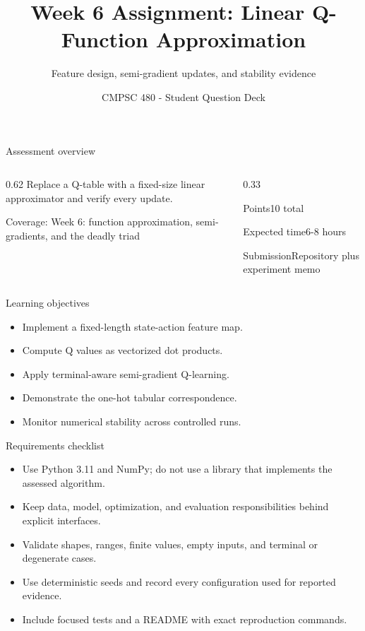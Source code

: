 \documentclass[aspectratio=169,11pt]{beamer}
\title[Week 6 Assignment Questions]{Week 6 Assignment: Linear Q-Function Approximation}
\subtitle{Feature design, semi-gradient updates, and stability evidence}
\author{CMPSC 480 - Student Question Deck}
\date{}
\begin{document}
\begin{frame}
  \titlepage
\end{frame}

\begin{frame}{Assessment overview}
\begin{columns}[T,onlytextwidth]
\begin{column}{0.62\textwidth}
\Large Replace a Q-table with a fixed-size linear approximator and verify every update.

\vspace{0.35cm}
\normalsize
Coverage: Week 6: function approximation, semi-gradients, and the deadly triad
\end{column}
\begin{column}{0.33\textwidth}
\begin{block}{Points}10 total\end{block}
\begin{block}{Expected time}6-8 hours\end{block}
\begin{block}{Submission}Repository plus experiment memo\end{block}
\end{column}
\end{columns}
\end{frame}

\begin{frame}{Learning objectives}
\begin{itemize}
  \item Implement a fixed-length state-action feature map.
  \item Compute Q values as vectorized dot products.
  \item Apply terminal-aware semi-gradient Q-learning.
  \item Demonstrate the one-hot tabular correspondence.
  \item Monitor numerical stability across controlled runs.
\end{itemize}
\end{frame}

\begin{frame}{Requirements checklist}
\small
\begin{itemize}
  \item Use Python 3.11 and NumPy; do not use a library that implements the assessed algorithm.
  \item Keep data, model, optimization, and evaluation responsibilities behind explicit interfaces.
  \item Validate shapes, ranges, finite values, empty inputs, and terminal or degenerate cases.
  \item Use deterministic seeds and record every configuration used for reported evidence.
  \item Include focused tests and a README with exact reproduction commands.
\end{itemize}
\end{frame}
\end{document}
